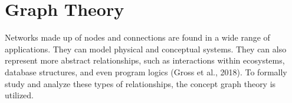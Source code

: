 



\section{Graph Theory}
\label{chap:graph_theory}

Networks made up of nodes and connections are found in a wide range of applications. They can model physical and conceptual systems. They can also represent more abstract relationships, such as interactions within ecosystems, database structures, and even program logics (Gross et al., 2018). To formally study and analyze these types of relationships, the concept graph theory is utilized.

